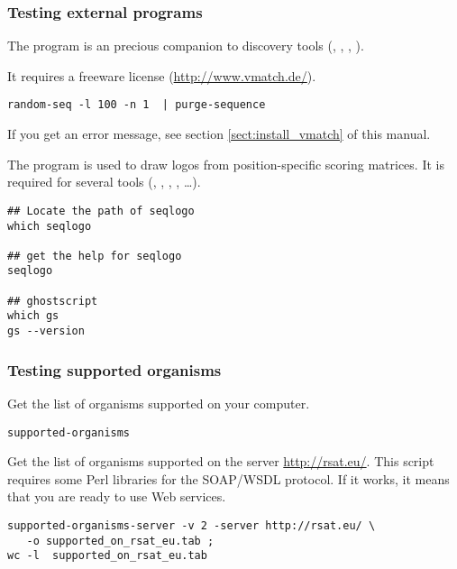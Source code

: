 \documentclass[12pt,a4paper, oneside]{scrreprt} %
\begin{document}
\subsubsection{Testing external programs}


The program  is an precious companion to \RSAT
discovery tools (, ,
, ).

It requires a freeware license (\url{http://www.vmatch.de/}).

\begin{lstlisting}
random-seq -l 100 -n 1  | purge-sequence
\end{lstlisting}

If you get an error message, see section \ref{sect:install_vmatch} of
this manual.



The program  is used to draw logos from
position-specific scoring matrices. It is required for several \RSAT
tools (, ,
, , \ldots).

\begin{lstlisting}
## Locate the path of seqlogo
which seqlogo

## get the help for seqlogo
seqlogo

## ghostscript
which gs
gs --version
\end{lstlisting}


\subsubsection{Testing supported organisms}

Get the list of organisms supported on your computer.

\begin{lstlisting}
supported-organisms
\end{lstlisting}

Get the list of organisms supported on the server
\url{http://rsat.eu/}. This script requires some Perl libraries for
the SOAP/WSDL protocol. If it works, it means that you are ready to
use \RSAT Web services.

\begin{lstlisting}
supported-organisms-server -v 2 -server http://rsat.eu/ \
   -o supported_on_rsat_eu.tab ; 
wc -l  supported_on_rsat_eu.tab
\end{lstlisting}
\end{document}
